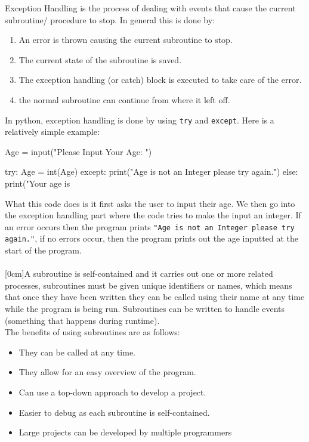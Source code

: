   Exception Handling is the process of dealing with events that cause the current subroutine/ procedure to stop. In general this is done by:
  \begin{enumerate}
    \setlength\itemsep{0em}
    \item An error is thrown causing the current subroutine to stop.
    \item The current state of the subroutine is saved.
    \item The exception handling (or catch) block is executed to take care of the error.
    \item the normal subroutine can continue from where it left off.
  \end{enumerate}
  In python, exception handling is done by using \verb|try| and \verb|except|. Here is a relatively simple example:
  \begin{python}
Age = input("Please Input Your Age: ")

try:
	Age = int(Age)
except:
	print("Age is not an Integer please try again.")
else:
	print("Your age is %
\end{python}
  What this code does is it first asks the user to input their age. We then go into the exception handling part where the code tries to make the input an integer. If an error occurs then the program prints \verb|"Age is not an Integer please try again."|, if no errors occur, then the program prints out the age inputted at the start of the program.\\ \\
  [0cm]A subroutine is self-contained and it carries out one or more related processes, subroutines must be given unique identifiers or names, which means that once they have been written they can be called using their name at any time while the program is being run. Subroutines can be written to handle events (something that happens during runtime).\\
  The benefits of using subroutines are as follows:
  \begin{itemize}
    \setlength\itemsep{0em}
    \item They can be called at any time.
    \item They allow for an easy overview of the program.
    \item Can use a top-down approach to develop a project.
    \item Easier to debug as each subroutine is self-contained.
    \item Large projects can be developed by multiple programmers
  \end{itemize}

